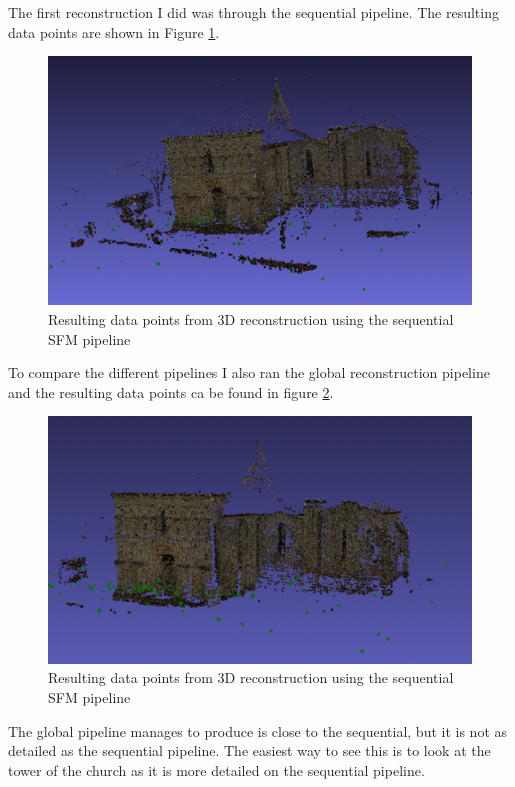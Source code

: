 \documentclass{article}
\begin{document}
    The first reconstruction I did was through the sequential pipeline. The resulting data points are shown in Figure \ref{fig:seqOut}.

\begin{figure}[H]
    \centering
    \includegraphics[width=1\textwidth]{seq_output.png} 
    \caption{Resulting data points from 3D reconstruction using the sequential SFM pipeline}
    \label{fig:seqOut}
\end{figure}

To compare the different pipelines I also ran the global reconstruction pipeline and the resulting data points ca be found in figure \ref{fig:globOut}.

\begin{figure}[H]
    \centering
    \includegraphics[width=1\textwidth]{glob_output.png} 
    \caption{Resulting data points from 3D reconstruction using the sequential SFM pipeline}
    \label{fig:globOut}
\end{figure}

The global pipeline manages to produce is close to the sequential, but it is not as detailed as the sequential pipeline. The easiest way to see this is to look at the tower of the church as it is more detailed on the sequential pipeline.
\end{document}
